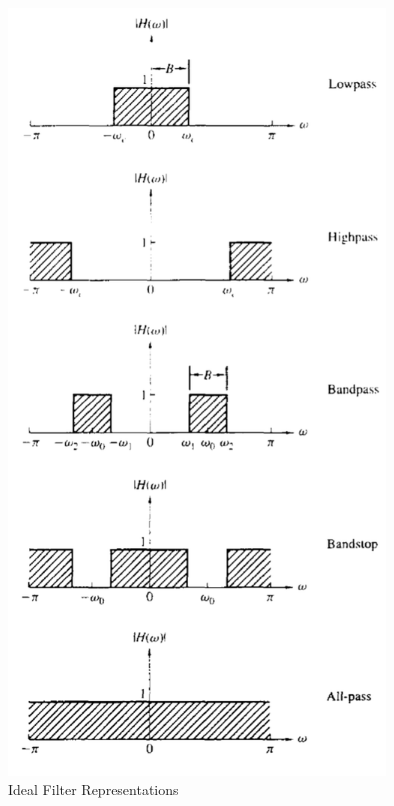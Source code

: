 \documentclass{article} %
\begin{document}
	\begin{figure}[h]
	\centering
	\includegraphics[width=10cm]{filt_t}
	\caption{Ideal Filter Representations}
	\end{figure}
\end{document}
